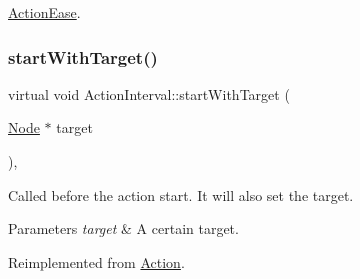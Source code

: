 \hyperlink{classActionEase_a2b1a6fe2d83fe96723ca32c30301fda5}{Action\+Ease}.

\mbox{\label{classActionInterval_aa3cff2a0fbd0935ca00e38a46b7bd878}} 
\subsubsection{\texorpdfstring{start\+With\+Target()}{startWithTarget()}\hspace{0.1cm}{\footnotesize\ttfamily [2/2]}}
{\footnotesize\ttfamily virtual void Action\+Interval\+::start\+With\+Target (\begin{DoxyParamCaption}\item[{\hyperlink{classNode}{Node} $\ast$}]{target }\end{DoxyParamCaption})\hspace{0.3cm}{\ttfamily [override]}, {\ttfamily [virtual]}}

Called before the action start. It will also set the target.


\begin{DoxyParams}{Parameters}
{\em target} & A certain target. \\
\hline
\end{DoxyParams}


Reimplemented from \hyperlink{classAction_a5457090e4a035c6283777c893a9a681b}{Action}.



